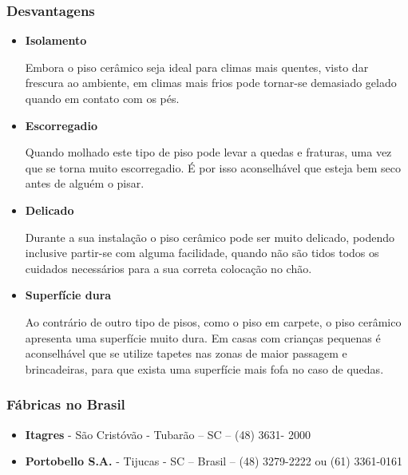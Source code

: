 \subsubsection*{\textbf{Desvantagens}}

	\begin{itemize}

	\item \textbf{Isolamento}

	Embora o piso cerâmico seja ideal para climas mais quentes, visto dar frescura ao ambiente, em climas mais frios pode tornar-se demasiado gelado quando em contato com os pés.

	\item \textbf{Escorregadio}
	
	Quando molhado este tipo de piso pode levar a quedas e fraturas, uma vez que se torna muito escorregadio. É por isso aconselhável que esteja bem seco antes de alguém o pisar.

	\item \textbf{Delicado}
	
	Durante a sua instalação o piso cerâmico pode ser muito delicado, podendo inclusive partir-se com alguma facilidade, quando não são tidos todos os cuidados necessários para a sua correta colocação no chão.

	\item \textbf{Superfície dura}
	
	Ao contrário de outro tipo de pisos, como o piso em carpete, o piso cerâmico apresenta uma superfície muito dura. Em casas com crianças pequenas é aconselhável que se utilize tapetes nas zonas de maior passagem e brincadeiras, para que exista uma superfície mais fofa no caso de quedas.

	\end{itemize}

\subsubsection*{\textbf{Fábricas no Brasil}}

	\begin{itemize}

	\item \textbf{Itagres} - São Cristóvão - Tubarão – SC – (48) 3631- 2000


	\item \textbf{Portobello S.A.} - Tijucas - SC – Brasil – (48) 3279-2222 ou (61) 3361-0161

	\end{itemize}


